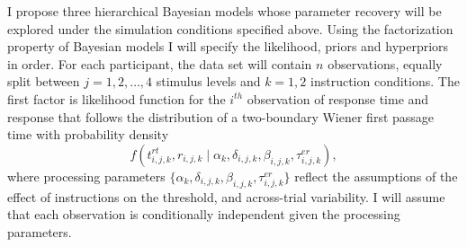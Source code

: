 \documentclass[12pt]{article}
\begin{document}
I propose three hierarchical Bayesian models whose parameter recovery will be explored under the simulation conditions
specified above. Using the factorization property of Bayesian models
I will specify the likelihood, priors and hyperpriors in order. For
each participant, the data set will contain $n$ observations, equally
split between $j = 1, 2, \dots, 4$ stimulus levels and $k = 1, 2$
instruction conditions. The first factor is likelihood function for the $i^{th}$ observation of response time and
response that follows the distribution of a two-boundary Wiener
first passage time with probability density
%
\begin{equation}
f(t_{i,j,k}^{rt}, r_{i,j,k} \mid \alpha_k, \delta_{i,j,k}, \beta_{i,j,k}, \tau_{i,j,k}^{er}),
\end{equation}
%
where processing parameters $
\{\alpha_k, \delta_{i,j,k}, \beta_{i,j,k}, \tau_{i,j,k}^{er}\}$ reflect the
assumptions of the effect of instructions on the threshold,
and across-trial variability. I will assume that each observation is
conditionally independent given the processing parameters.
\end{document}
